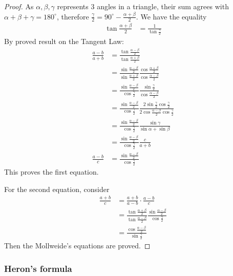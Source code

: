 \documentclass[12pt]{article}
\begin{document}
    \begin{proof}
        As $\alpha,\beta,\gamma$ represents 3 angles in a triangle, their sum agrees with $\alpha+\beta+\gamma=180^\circ$, therefore $\frac{\gamma}{2}=90^\circ - \frac{\alpha+\beta}{2}$. We have the equality \begin{align*}
            \tan{\frac{\alpha+\beta}{2}}&=\frac{1}{\tan{\frac{\gamma}{2}}}
        \end{align*}
        By proved result on the Tangent Law:\begin{align*}
            \frac{a-b}{a+b}&=\frac{\tan{\frac{\alpha-\beta}{2}}}{\tan{\frac{\alpha+\beta}{2}}}\\
            &=\frac{\sin{\frac{\alpha-\beta}{2}}}{\sin{\frac{\alpha+\beta}{2}}}\frac{\cos{\frac{\alpha+\beta}{2}}}{\cos{\frac{\alpha-\beta}{2}}}\\
            &=\frac{\sin{\frac{\alpha-\beta}{2}}}{\cos{\frac{\gamma}{2}}}\frac{\sin{\frac{\gamma}{2}}}{\cos{\frac{\alpha-\beta}{2}}}\\
            &=\frac{\sin{\frac{\alpha-\beta}{2}}}{\cos{\frac{\gamma}{2}}}\frac{2\sin{\frac{\gamma}{2}}\cos{\frac{\gamma}{2}}}{2\cos{\frac{\alpha-\beta}{2}}\cos{\frac{\gamma}{2}}}\\
            &=\frac{\sin{\frac{\alpha-\beta}{2}}}{\cos{\frac{\gamma}{2}}}\frac{\sin{\gamma}}{\sin{\alpha}+\sin{\beta}}\\
            &=\frac{\sin{\frac{\alpha-\beta}{2}}}{\cos{\frac{\gamma}{2}}}\frac{c}{a+b}\\
            \frac{a-b}{c}&=\frac{\sin{\frac{\alpha-\beta}{2}}}{\cos{\frac{\gamma}{2}}}
        \end{align*}
        This proves the first equation.

        For the second equation, consider \begin{align*}
            \frac{a+b}{c}&=\frac{a+b}{a-b}\cdot \frac{a-b}{c}\\
            &=\frac{\tan{\frac{\alpha+\beta}{2}}}{\tan{\frac{\alpha-\beta}{2}}}\frac{\sin{\frac{\alpha-\beta}{2}}}{\cos{\frac{\gamma}{2}}}\\
            &=\frac{\cos{\frac{\alpha-\beta}{2}}}{\sin{\frac{\gamma}{2}}}
        \end{align*}
        Then the Mollweide's equations are proved.
    \end{proof}

    \subsubsection*{Heron's formula}
\end{document}
